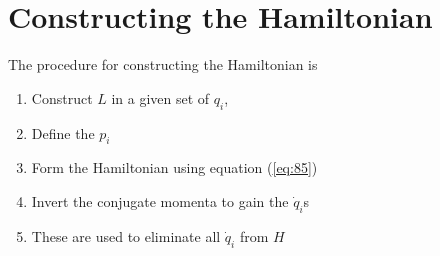 \section{Constructing the Hamiltonian}
\label{sec:constr-hamilt}

The procedure for constructing the Hamiltonian is
\begin{enumerate}
\item Construct $L$ in a given set of $q_i$,
\item Define the $p_i$
\item Form the Hamiltonian using equation (\ref{eq:85})
\item Invert the conjugate momenta to gain the $\dot{q}_i$s
\item These are used to eliminate all $\dot{q}_i$ from $H$
\end{enumerate}


